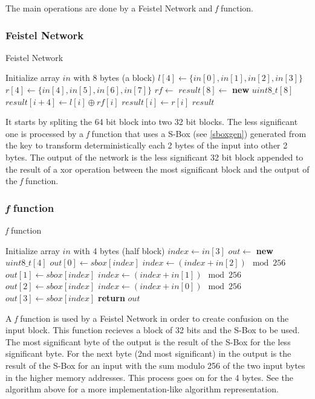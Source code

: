 \documentclass{article} %
\begin{document}
The main operations are done by a Feistel Network and \textit{f} function.

\subsubsection{Feistel Network}

\begin{algorithm}[H]
  \caption{Feistel Network}
  \begin{algorithmic}[1]
  \State Initialize array $in$ with 8 bytes (a block)
  \State $l[4] \gets \{in[0], in[1], in[2], in[3]\}$
  \State $r[4] \gets \{in[4], in[5], in[6], in[7]\}$
  \State $rf \gets$ 
  \State $result[8] \gets$ \textbf{new} $uint8\_t[8]$
    \State $result[i + 4] \gets l[i] \oplus rf[i]$
    \State $result[i] \gets r[i]$
  \EndFor
  \State \Return $result$
  \end{algorithmic}
\end{algorithm}

It starts by spliting the 64 bit block into two 32 bit blocks.
The less significant one is processed by a \textit{f} function that uses a S-Box (see \autoref{sboxgen}) 
generated from the key to transform deterministically each 2 bytes of the input into other 2 bytes.
The output of the network is the less significant 32 bit block appended to the result of a xor operation between 
the most significant block and the output of the \textit{f} function.

\subsubsection{\textit{f} function}

\begin{algorithm}[H]
  \caption{\textit{f} function}
\begin{algorithmic}[1]
  \State Initialize array $in$ with 4 bytes (half block)
  \State $index \gets in[3]$
  \State $out \gets$ \textbf{new} $uint8\_t[4]$
  \State $out[0] \gets sbox[index]$
  \State $index \gets (index + in[2]) \mod 256$
  \State $out[1] \gets sbox[index]$
  \State $index \gets (index + in[1]) \mod 256$
  \State $out[2] \gets sbox[index]$
  \State $index \gets (index + in[0]) \mod 256$
  \State $out[3] \gets sbox[index]$
  \State \textbf{return} $out$
\end{algorithmic}
\end{algorithm}

A \textit{f} function is used by a Feistel Network in order to create confusion on the input block.
This function recieves a block of 32 bits and the S-Box to be used. The most significant byte of the output is 
the result of the S-Box for the less significant byte. For the next byte (2nd most significant) in the 
output is the result of the S-Box for an input with the sum modulo 256 of the two input bytes in the higher memory addresses.
This process goes on for the 4 bytes. See the algorithm above for a more implementation-like algorithm representation.
\end{document}
